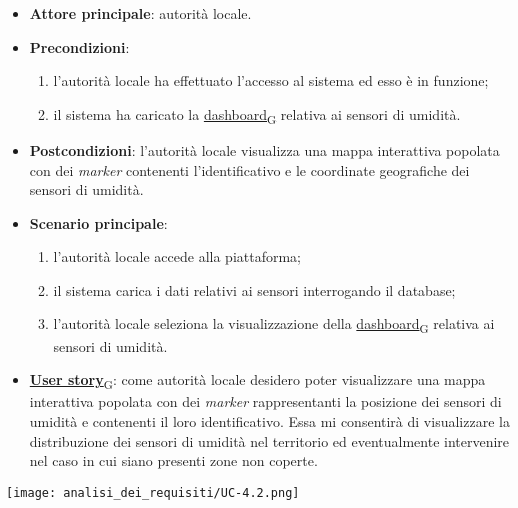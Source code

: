 \begin{itemize}
	\item \textbf{Attore principale}: autorità locale.
	\item \textbf{Precondizioni}:
	      \begin{enumerate}
		      \item l'autorità locale ha effettuato l'accesso al sistema ed esso è in funzione;
		      \item il sistema ha caricato la \href{https://7last.github.io/docs/pb/documentazione-interna/glossario\#dashboard}{dashboard\textsubscript{G}} relativa ai sensori di umidità.
	      \end{enumerate}
	\item \textbf{Postcondizioni}: l'autorità locale visualizza una mappa interattiva popolata con dei \textit{marker} contenenti l'identificativo e le coordinate geografiche dei sensori di umidità.
	\item \textbf{Scenario principale}:
	      \begin{enumerate}
		      \item l'autorità locale accede alla piattaforma;
		      \item il sistema carica i dati relativi ai sensori interrogando il database;
		      \item l'autorità locale seleziona la visualizzazione della \href{https://7last.github.io/docs/pb/documentazione-interna/glossario\#dashboard}{dashboard\textsubscript{G}} relativa ai sensori di umidità.
	      \end{enumerate}
	\item \href{https://7last.github.io/docs/pb/documentazione-interna/glossario\#user-story}{\textbf{User story}\textsubscript{G}}:
	      come autorità locale desidero poter visualizzare una mappa interattiva popolata con dei \textit{marker} rappresentanti la posizione dei sensori di umidità
	      e contenenti il loro identificativo. Essa mi consentirà di visualizzare la distribuzione dei sensori di umidità nel territorio ed eventualmente intervenire nel caso in cui siano presenti zone non coperte.
\end{itemize}
\begin{center}
	\texttt{[image: analisi\_dei\_requisiti/UC-4.2.png]}
\end{center}


